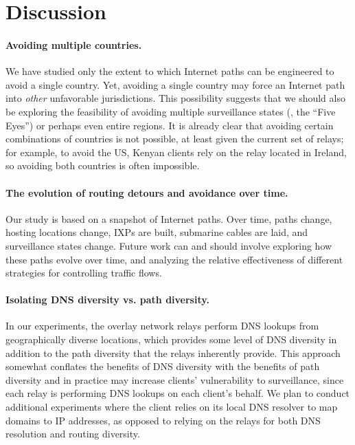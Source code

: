 \section{Discussion}
\label{discussion}

\paragraph{Avoiding multiple countries.} 
We have studied only the extent to which Internet paths can be
engineered to avoid a {single} country.  Yet, avoiding a single country
may force an Internet path into {\em other} unfavorable
jurisdictions. This possibility suggests that we should also be
exploring the feasibility of avoiding multiple surveillance states (\eg,
the ``Five Eyes'') or perhaps even entire regions. It is already clear
that avoiding certain combinations of countries is not possible, at
least given the current set of relays; for
example, to avoid the US, Kenyan clients rely on the relay located in
Ireland, so avoiding both countries is often impossible.

\paragraph{The evolution of routing detours and avoidance over time.}
Our study is based on a snapshot of Internet paths. Over time, paths
change, hosting locations change, IXPs are built, submarine cables are
laid, and surveillance states change.  Future work can and should
involve exploring how these paths evolve over time, and analyzing the
relative effectiveness of different strategies for controlling traffic flows.

\paragraph{Isolating DNS diversity vs. path diversity.}
In our experiments, the overlay network relays perform DNS lookups from
geographically diverse locations, which provides some level of DNS
diversity in addition to the path diversity that the relays inherently
provide. This approach somewhat conflates the benefits of DNS diversity
with the benefits of path diversity and in practice may increase
clients' vulnerability to surveillance, since each relay is performing
DNS lookups on each client's behalf. We plan to conduct additional
experiments where the client relies on its local DNS resolver to map
domains to IP addresses, as opposed to relying on the relays for both
DNS resolution and routing diversity.
